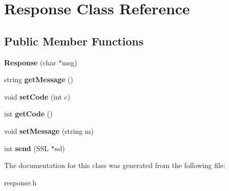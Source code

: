 \hypertarget{classResponse}{\section{Response Class Reference}
\label{classResponse}
}
\subsection*{Public Member Functions}
\begin{DoxyCompactItemize}
\item 
\hypertarget{classResponse_a1bc8692eaacdb7b8774b44de34ac8cf9}{{\bfseries Response} (char $\ast$msg)}\label{classResponse_a1bc8692eaacdb7b8774b44de34ac8cf9}

\item 
\hypertarget{classResponse_ac1f4a94dd37141bd114414747ae02dca}{string {\bfseries get\-Message} ()}\label{classResponse_ac1f4a94dd37141bd114414747ae02dca}

\item 
\hypertarget{classResponse_adc3463febb6699b70b856662e9f05fd3}{void {\bfseries set\-Code} (int c)}\label{classResponse_adc3463febb6699b70b856662e9f05fd3}

\item 
\hypertarget{classResponse_afa29787d9affc4746c52f6654f8c70fe}{int {\bfseries get\-Code} ()}\label{classResponse_afa29787d9affc4746c52f6654f8c70fe}

\item 
\hypertarget{classResponse_a56e529dec0203b07b8ad014bdc45d5f3}{void {\bfseries set\-Message} (string m)}\label{classResponse_a56e529dec0203b07b8ad014bdc45d5f3}

\item 
\hypertarget{classResponse_abce3574f30c1da932dd94dc72e89538d}{int {\bfseries send} (S\-S\-L $\ast$ssl)}\label{classResponse_abce3574f30c1da932dd94dc72e89538d}

\end{DoxyCompactItemize}


The documentation for this class was generated from the following file\-:\begin{DoxyCompactItemize}
\item 
response.\-h\end{DoxyCompactItemize}
